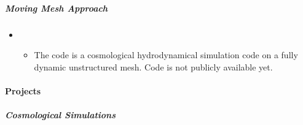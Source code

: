 \documentclass[letterpaper,10pt,english]{sphinxmanual}
\begin{document}
\subparagraph{Moving Mesh Approach}
\label{\detokenize{resource/astro/topics/simulations:moving-mesh-approach}}\begin{itemize}
\item {} 
\begin{itemize}
\item {} 
The  code is a cosmological hydrodynamical simulation
code on a fully dynamic unstructured mesh. Code is not publicly
available yet.

\end{itemize}

\end{itemize}


\paragraph{Projects}
\label{\detokenize{resource/astro/topics/simulations:projects}}

\subparagraph{Cosmological Simulations}
\label{\detokenize{resource/astro/topics/simulations:cosmological-simulations}}
\end{document}
